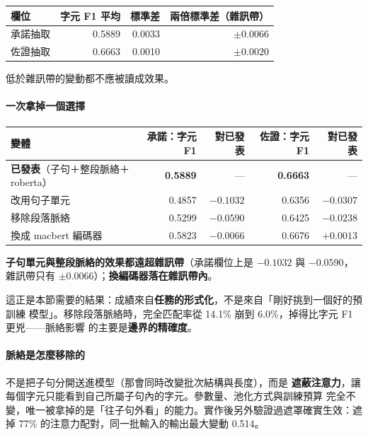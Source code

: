\documentclass[11pt,a4paper]{ctexart}
\begin{document}
\begin{table}[h]
\centering\small
\begin{tabular}{@{}lrrr@{}}
\toprule
欄位 & 字元 F1 平均 & 標準差 & 兩倍標準差（雜訊帶） \\
\midrule
承諾抽取 & 0.5889 & 0.0033 & $\pm 0.0066$ \\
佐證抽取 & 0.6663 & 0.0010 & $\pm 0.0020$ \\
\bottomrule
\end{tabular}
\end{table}

低於雜訊帶的變動都不應被讀成效果。

\paragraph{一次拿掉一個選擇}

\begin{table}[h]
\centering\small
\begin{tabular}{@{}lrrrr@{}}
\toprule
變體 & 承諾：字元 F1 & 對已發表 & 佐證：字元 F1 & 對已發表 \\
\midrule
\rowcolor{green!12}
\textbf{已發表}（子句＋整段脈絡＋roberta） & \textbf{0.5889} & --- & \textbf{0.6663} & --- \\
\rowcolor{yellow!15}
改用句子單元 & 0.4857 & $\mathbf{-0.1032}$ & 0.6356 & $\mathbf{-0.0307}$ \\
\rowcolor{yellow!15}
移除段落脈絡 & 0.5299 & $\mathbf{-0.0590}$ & 0.6425 & $\mathbf{-0.0238}$ \\
換成 macbert 編碼器 & 0.5823 & $-0.0066$ & 0.6676 & $+0.0013$ \\
\bottomrule
\end{tabular}
\end{table}

\begin{tcolorbox}[colback=green!5, colframe=green!45, title=兩個形式化選擇都站得住，編碼器選擇則不重要]
\textbf{子句單元與整段脈絡的效果都遠超雜訊帶}（承諾欄位上是 $-0.1032$ 與 $-0.0590$，
雜訊帶只有 $\pm 0.0066$）；\textbf{換編碼器落在雜訊帶內}。

\medskip
這正是本節需要的結果：成績來自\textbf{任務的形式化}，不是來自「剛好挑到一個好的預訓練
模型」。移除段落脈絡時，完全匹配率從 14.1\% 崩到 6.0\%，掉得比字元 F1 更兇——脈絡影響
的主要是\textbf{邊界的精確度}。
\end{tcolorbox}

\paragraph{脈絡是怎麼移除的} 不是把子句分開送進模型（那會同時改變批次結構與長度），而是
\textbf{遮蔽注意力}，讓每個字元只能看到自己所屬子句內的字元。參數量、池化方式與訓練預算
完全不變，唯一被拿掉的是「往子句外看」的能力。實作後另外驗證過遮罩確實生效：遮掉 77\%
的注意力配對，同一批輸入的輸出最大變動 0.514。
\end{document}

